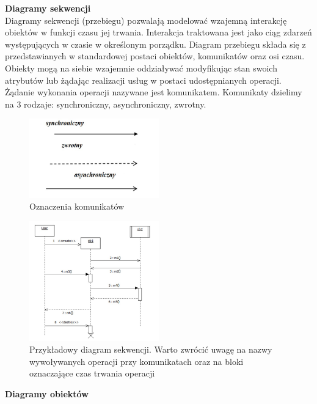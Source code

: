 \documentclass[a4paper,12pt,oneside]{book}
\begin{document}
				\textbf{Diagramy sekwencji}\\
                Diagramy sekwencji (przebiegu) pozwalają modelować wzajemną interakcję obiektów w funkcji czasu jej trwania. Interakcja traktowana jest jako ciąg zdarzeń występujących w czasie w określonym porządku. Diagram przebiegu składa się z przedstawianych w standardowej postaci obiektów, komunikatów oraz osi czasu. Obiekty mogą na siebie wzajemnie oddziaływać modyfikując stan swoich atrybutów lub żądając realizacji usług w postaci udostępnianych operacji. Żądanie wykonania operacji nazywane jest komunikatem. Komunikaty dzielimy na 3 rodzaje: synchroniczny, asynchroniczny, zwrotny.               \begin{figure}[H]
                    \centering
                    \includegraphics[width=0.5\textwidth]{images/d_sequence_coms.jpg}
                    \caption{Oznaczenia komunikatów}
                    \label{fig:twojastara41}
                \end{figure}
                \begin{figure}[h]
                    \centering
                    \includegraphics[width=0.5\textwidth]{images/d_sequence.jpg}
                    \caption{Przykładowy diagram sekwencji. Warto zwrócić uwagę na nazwy wywoływanych operacji przy komunikatach oraz na bloki oznaczające czas trwania operacji}
                    \label{fig:twojastara42}
                \end{figure}
				\textbf{Diagramy obiektów}\\
\end{document}
